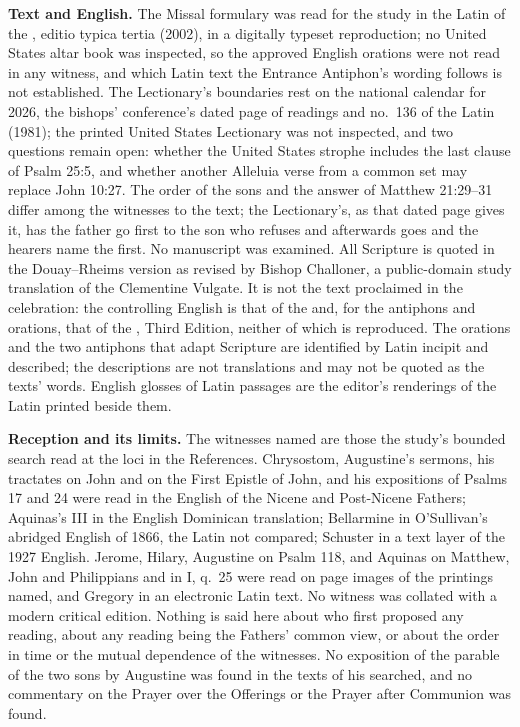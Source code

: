 {\textbf{Text and English.} The Missal formulary was read for the study in the
Latin of the , editio typica tertia (2002), in a
digitally typeset reproduction; no United States altar book was inspected, so
the approved English orations were not read in any witness, and which Latin
text the Entrance Antiphon's wording follows is not established. The
Lectionary's boundaries rest on the national calendar for 2026, the bishops'
conference's dated page of readings and no.~136 of the Latin  (1981); the printed United States Lectionary was not
inspected, and two questions remain open: whether the United States strophe
includes the last clause of Psalm 25:5, and whether another Alleluia verse
from a common set may replace John 10:27. The order of
the sons and the answer of Matthew 21:29--31 differ among the witnesses to the
text; the Lectionary's, as that dated page gives it, has the father go first to
the son who refuses and afterwards goes and the hearers name the first. No
manuscript was examined. All Scripture is quoted in the Douay--Rheims version
as revised by Bishop Challoner, a public-domain study translation of the
Clementine Vulgate. It is not the text proclaimed in the celebration: the
controlling English is that of the  and, for the antiphons and orations,
that of the , Third Edition, neither of which is reproduced.
The orations and the two antiphons that adapt Scripture are identified by Latin
incipit and described; the descriptions are not translations and may not be
quoted as the texts' words. English glosses of Latin passages are the editor's
renderings of the Latin printed beside them.

\textbf{Reception and its limits.} The witnesses named are those the study's
bounded search read at the loci in the References. Chrysostom, Augustine's
sermons, his tractates on John and on the First Epistle of John, and his
expositions of Psalms 17 and 24 were read in the English of the Nicene and
Post-Nicene Fathers; Aquinas's  III in the English Dominican
translation; Bellarmine in O'Sullivan's abridged English of 1866, the Latin not
compared; Schuster in a text layer of the 1927 English. Jerome, Hilary,
Augustine on Psalm 118, and Aquinas on Matthew, John and Philippians and in
 I, q.~25 were read on page images of the printings named, and
Gregory in an electronic Latin text. No witness was collated with a modern
critical edition. Nothing is said here about who first proposed any reading,
about any reading being the Fathers' common view, or about the order in time
or the mutual dependence of the witnesses. No exposition of the parable of the
two sons by Augustine was found in the texts of his searched, and no commentary
on the Prayer over the Offerings or the Prayer after Communion was found.

}
